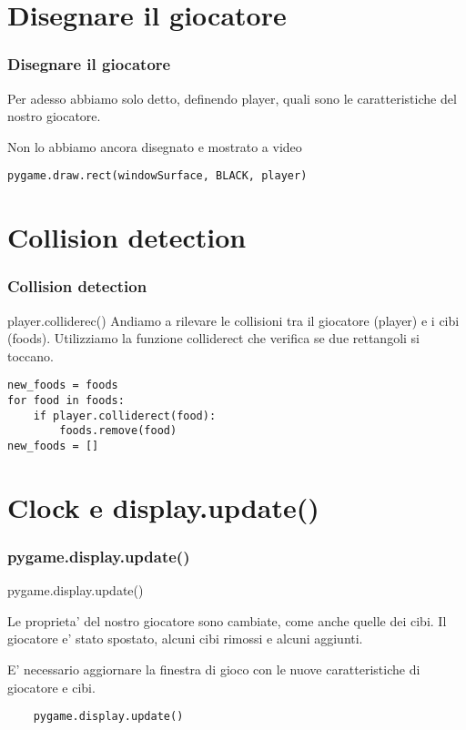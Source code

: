\documentclass{beamer}
\begin{document}
\section{Disegnare il giocatore}

\begin{frame}[fragile]
\frametitle{Disegnare il giocatore}

Per adesso abbiamo solo detto, definendo player, quali sono le caratteristiche del nostro giocatore.

Non lo abbiamo ancora disegnato e mostrato a video

\begin{lstlisting}
pygame.draw.rect(windowSurface, BLACK, player)
\end{lstlisting}

\end{frame}

\section{Collision detection}

\begin{frame}[fragile]
\frametitle{Collision detection}

\begin{block}{player.colliderec()}
Andiamo a rilevare le collisioni tra il giocatore (player) e i cibi (foods).
Utilizziamo la funzione colliderect che verifica se due rettangoli si toccano.
\end{block}

\begin{lstlisting}
new_foods = foods
for food in foods:
    if player.colliderect(food):
        foods.remove(food)
new_foods = []
\end{lstlisting}

\end{frame}

\section{Clock e display.update()}

\begin{frame}[fragile]
\frametitle{pygame.display.update()}

\begin{block}{pygame.display.update()}

Le proprieta' del nostro giocatore sono cambiate, come anche quelle dei cibi. Il giocatore e' stato spostato, alcuni cibi rimossi e alcuni aggiunti.

E' necessario aggiornare la finestra di gioco con le nuove caratteristiche di giocatore e cibi.
\end{block}

\begin{lstlisting}
    pygame.display.update()
\end{lstlisting}

\end{frame}
\end{document}
